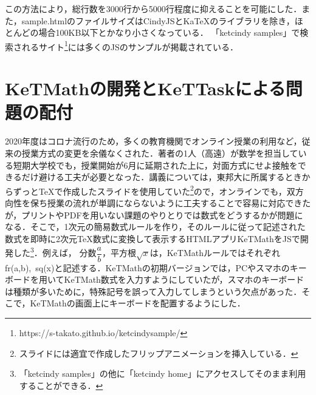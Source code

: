 \documentclass[a4j,12pt]{ujarticle}
\begin{document}
この方法により，総行数を3000行から5000行程度に抑えることを可能にした．また，sample.htmlのファイルサイズはCindyJSとKaTeXのライブラリを除き，ほとんどの場合100KB以下とかなり小さくなっている．
「ketcindy samples」で検索されるサイト\footnote{https://s-takato.github.io/ketcindysample/}には多くの\ketcindy JSのサンプルが掲載されている．

\section{KeTMathの開発とKeTTaskによる問題の配付}

2020年度はコロナ流行のため，多くの教育機関でオンライン授業の利用など，従来の授業方式の変更を余儀なくされた．著者の1人（高遠）が数学を担当している短期大学校でも，授業開始が6月に延期された上に，対面方式にせよ接触をできるだけ避ける工夫が必要となった．講義については，東邦大に所属するときからずっと\TeX で作成したスライドを使用していた\footnote{スライドには適宜\ketcindy で作成したフリップアニメーションを挿入している．}ので，オンラインでも，双方向性を保ち授業の流れが単調にならないように工夫することで容易に対応できたが，プリントやPDFを用いない課題のやりとりでは数式をどうするかが問題になる．そこで，1次元の簡易数式ルールを作り，そのルールに従って記述された数式を即時に2次元\TeX 数式に変換して表示するHTMLアプリKeTMathを\ketcindy JSで開発した\footnote{「ketcindy samples」の他に「ketcindy home」にアクセスしてそのまま利用することができる．}．例えば，
分数$\dfrac{a}{b}$，平方根$\sqrt{x}$は，KeTMathルールではそれぞれfr(a,b),\ sq(x)と記述する．KeTMathの初期バージョンでは，PCやスマホのキーボードを用いてKeTMath数式を入力すようにしていたが，スマホのキーボードは種類が多いために，特殊記号を誤って入力してしまうという欠点があった．そこで，KeTMathの画面上にキーボードを配置するようにした．
\end{document}
